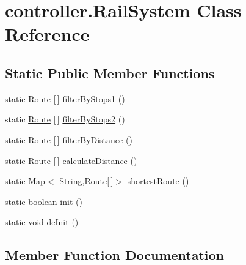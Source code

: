 \hypertarget{classcontroller_1_1_rail_system}{}\section{controller.\+Rail\+System Class Reference}
\label{classcontroller_1_1_rail_system}
\subsection*{Static Public Member Functions}
\begin{DoxyCompactItemize}
\item 
static \hyperlink{classdomain_1_1_route}{Route} \mbox{[}$\,$\mbox{]} \hyperlink{classcontroller_1_1_rail_system_aecab2f33307d056fc39b715421705d62}{filter\+By\+Stops1} ()
\item 
static \hyperlink{classdomain_1_1_route}{Route} \mbox{[}$\,$\mbox{]} \hyperlink{classcontroller_1_1_rail_system_aac5dfeee25bd54a9a4bbdb64d52acf9f}{filter\+By\+Stops2} ()
\item 
static \hyperlink{classdomain_1_1_route}{Route} \mbox{[}$\,$\mbox{]} \hyperlink{classcontroller_1_1_rail_system_af0f79e772114a04e35ee1f0a8eae66e4}{filter\+By\+Distance} ()
\item 
static \hyperlink{classdomain_1_1_route}{Route} \mbox{[}$\,$\mbox{]} \hyperlink{classcontroller_1_1_rail_system_ac9b98bc0b0a485cc9c4a85cc6814186e}{calculate\+Distance} ()
\item 
static Map$<$ String,\hyperlink{classdomain_1_1_route}{Route}\mbox{[}$\,$\mbox{]}$>$ \hyperlink{classcontroller_1_1_rail_system_a4eccf86f1b3525490c6d44b0522d746b}{shortest\+Route} ()
\item 
static boolean \hyperlink{classcontroller_1_1_rail_system_aaa1ab4d489fd21a5e968723c2afd89b2}{init} ()
\item 
static void \hyperlink{classcontroller_1_1_rail_system_a03e61f5c81b49dfc59b0d3b7eefc1067}{de\+Init} ()
\end{DoxyCompactItemize}


\subsection{Member Function Documentation}
\mbox{\label{classcontroller_1_1_rail_system_ac9b98bc0b0a485cc9c4a85cc6814186e}} 
